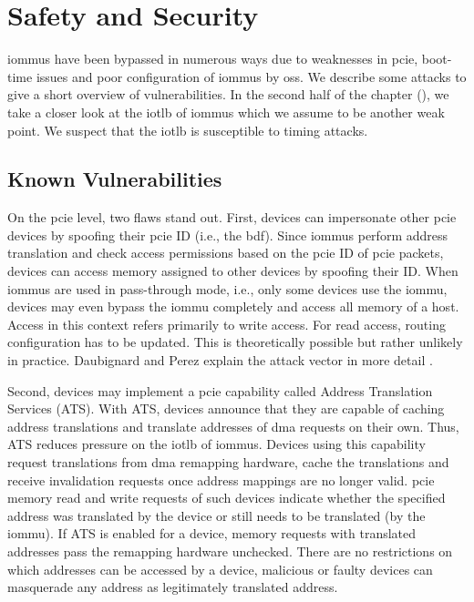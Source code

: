\chapter{Safety and Security}
\label{chap:safety_and_security}

\acp{iommu} have been bypassed in numerous ways due to weaknesses in \ac{pcie},
boot-time issues and poor configuration of \acp{iommu} by \acp{os}. We describe
some attacks to give a short overview of vulnerabilities. In the second half of
the chapter (), we take a closer look at the \ac{iotlb} of
\acp{iommu} which we assume to be another weak point. We suspect that the
\ac{iotlb} is susceptible to timing attacks.


\section{Known Vulnerabilities}
\label{sec:known_vulnerabilities}

On the \ac{pcie} level, two flaws stand out. First, devices can impersonate
other \ac{pcie} devices by spoofing their \ac{pcie} ID (i.e., the \ac{bdf}).
Since \acp{iommu} perform address translation and check access permissions based
on the \ac{pcie} ID of \ac{pcie} packets, devices can access memory assigned to
other devices by spoofing their ID. When \acp{iommu} are used in pass-through
mode, i.e., only some devices use the \ac{iommu}, devices may even bypass the
\ac{iommu} completely and access all memory of a host. Access in this context
refers primarily to write access. For read access, routing configuration has to
be updated. This is theoretically possible but rather unlikely in practice.
Daubignard and Perez explain the attack vector in more detail
\cite{daubignard2017protip}.

Second, devices may implement a \ac{pcie} capability called Address Translation
Services (ATS). With ATS, devices announce that they are capable of caching
address translations and translate addresses of \ac{dma} requests on their own.
Thus, ATS reduces pressure on the \ac{iotlb} of \acp{iommu}. Devices using this
capability request translations from \ac{dma} remapping hardware, cache the
translations and receive invalidation requests once address mappings are no
longer valid. \ac{pcie} memory read and write requests of such devices indicate
whether the specified address was translated by the device or still needs to be
translated (by the \ac{iommu}). If ATS is enabled for a device, memory requests
with translated addresses pass the remapping hardware unchecked. There are no
restrictions on which addresses can be accessed by a device, malicious or faulty
devices can masquerade any address as legitimately translated address.


